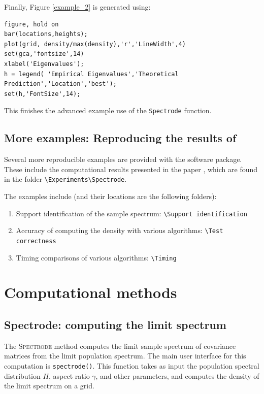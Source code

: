 \documentclass[english,11pt]{article} %
\begin{document}
Finally, Figure \ref{example_2} is generated using:


\begin{verbatim}
figure, hold on
bar(locations,heights);
plot(grid, density/max(density),'r','LineWidth',4)
set(gca,'fontsize',14)
xlabel('Eigenvalues');
h = legend( 'Empirical Eigenvalues','Theoretical Prediction','Location','best');
set(h,'FontSize',14);
\end{verbatim}

This finishes the advanced example use of the \verb+Spectrode+ function. 

\subsection{More examples: Reproducing the results of \cite{dobriban2015efficient}}

Several more reproducible examples are provided with the software package. These include the computational results presented in the paper \cite{dobriban2015efficient}, which are found in the folder \verb+\Experiments\Spectrode+. 

The examples include (and their locations are the following folders):

\begin{enumerate}
\item Support identification of the sample spectrum: \verb+\Support identification+
\item Accuracy of computing the density with various algorithms: \verb+\Test correctness+
\item Timing comparisons of various algorithms: \verb+\Timing+ 
\end{enumerate}



\section{Computational methods}
\label{methods}

\subsection{Spectrode: computing the limit spectrum}
\label{atomic_description}

The \textsc{Spectrode} method computes the limit sample spectrum of covariance matrices from the limit population spectrum. The  main user interface for this computation is \verb+spectrode()+. This function takes as input the population spectral distribution $H$, aspect ratio $\gamma$, and other parameters, and computes the density of the limit spectrum on a grid. 
\end{document}
